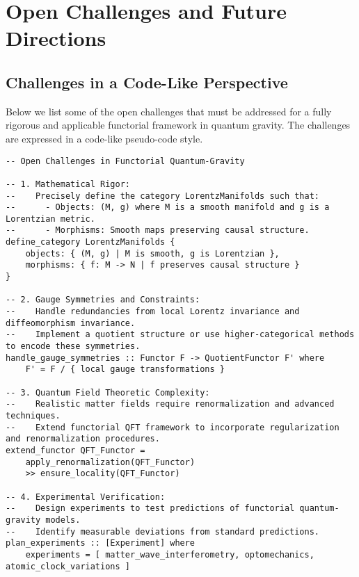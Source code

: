 \documentclass[12pt]{article}
\begin{document}
\section{Open Challenges and Future Directions}
\subsection{Challenges in a Code-Like Perspective}
Below we list some of the open challenges that must be addressed for a fully rigorous and applicable functorial framework in quantum gravity. The challenges are expressed in a code-like pseudo-code style.

\begin{lstlisting}[caption={Pseudo-code listing of open challenges}, basicstyle=\ttfamily\footnotesize]
-- Open Challenges in Functorial Quantum-Gravity

-- 1. Mathematical Rigor:
--    Precisely define the category LorentzManifolds such that:
--      - Objects: (M, g) where M is a smooth manifold and g is a Lorentzian metric.
--      - Morphisms: Smooth maps preserving causal structure.
define_category LorentzManifolds {
    objects: { (M, g) | M is smooth, g is Lorentzian },
    morphisms: { f: M -> N | f preserves causal structure }
}

-- 2. Gauge Symmetries and Constraints:
--    Handle redundancies from local Lorentz invariance and diffeomorphism invariance.
--    Implement a quotient structure or use higher-categorical methods to encode these symmetries.
handle_gauge_symmetries :: Functor F -> QuotientFunctor F' where
    F' = F / { local gauge transformations }

-- 3. Quantum Field Theoretic Complexity:
--    Realistic matter fields require renormalization and advanced techniques.
--    Extend functorial QFT framework to incorporate regularization and renormalization procedures.
extend_functor QFT_Functor = 
    apply_renormalization(QFT_Functor)
    >> ensure_locality(QFT_Functor)

-- 4. Experimental Verification:
--    Design experiments to test predictions of functorial quantum-gravity models.
--    Identify measurable deviations from standard predictions.
plan_experiments :: [Experiment] where
    experiments = [ matter_wave_interferometry, optomechanics, atomic_clock_variations ]
\end{lstlisting}
\end{document}

